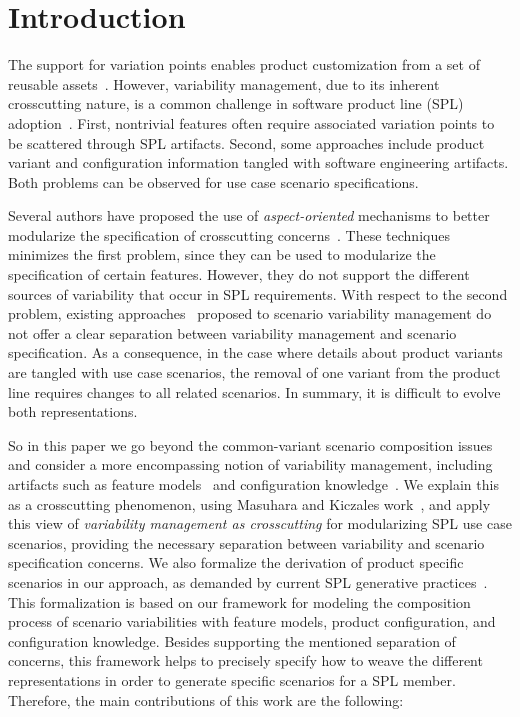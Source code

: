\documentclass{sig-alt-full}
\begin{document}



\section{Introduction}
The support for variation points enables product customization from a set of
reusable assets~\cite{Pohl:2005aa}. However, variability management, due to its
inherent crosscutting nature, is a common challenge in software product line
(SPL) adoption~\cite{Clements:2001aa,Pohl:2005aa}. First, nontrivial features
often require associated variation points to be scattered through SPL artifacts.
Second, some approaches include product variant and configuration information
tangled with software engineering artifacts. Both problems can be observed for use case scenario
specifications.

Several authors have proposed the use of \emph{aspect-oriented} mechanisms to
better modularize the specification of crosscutting
concerns~\cite{Moreira:2004aa,Chitchyan:2007aa}. These techniques minimizes the
first problem, since they can be used to modularize the specification of certain
features. However, they do not support the different sources of variability that
occur in SPL requirements. With respect to the second problem, existing
approaches~\cite{Bertolino:2003aa,Eriksson:2005aa} proposed to
scenario variability management do not offer a clear separation between
variability management and scenario specification. As a consequence, in the case
where details about product variants are tangled with use case scenarios, the
removal of one variant from the product line requires changes to all related
scenarios. In summary, it is difficult to evolve both representations.

So in this paper we go beyond the common-variant scenario composition issues and
consider a more encompassing notion of variability management, including
artifacts such as feature models~\cite{Gheyi:2006aa,Czarnecki:2000aa} and
configuration knowledge~\cite{Czarnecki:2000aa,Pohl:2005aa}. We explain this as a
crosscutting phenomenon, using Masuhara and Kiczales work~\cite{Masuhara:2003aa},
and apply this view of \emph{variability management as crosscutting} for
modularizing SPL use case scenarios, providing the necessary separation between
variability and scenario specification concerns. We also formalize the derivation
of product specific scenarios in our approach, as demanded by current SPL
generative practices~\cite{Krueger:2006aa}. This formalization is based on our
framework for modeling the composition process of scenario variabilities with
feature models, product configuration, and configuration knowledge. Besides
supporting the mentioned separation of concerns, this framework helps to
precisely specify how to weave the different representations in order to generate
specific scenarios for a SPL member. Therefore, the main contributions of this
work are the following:
\end{document}

